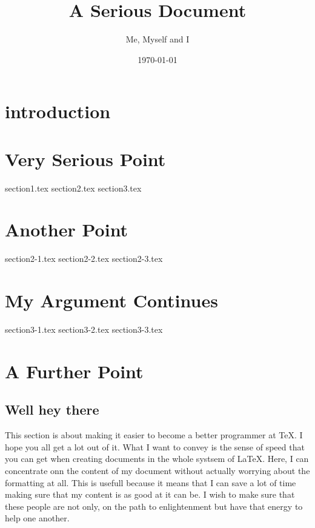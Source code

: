\documentclass[a4paper]{report}
\title{A Serious Document}
\author{Me, Myself and I}
\date{\today}
\begin{document}
\maketitle

\tableofcontents
\pagebreak

\begin{abstract}

\end{abstract}

\chapter{introduction}


\chapter{Very Serious Point}
{section1.tex}
{section2.tex}
{section3.tex}

\chapter{Another Point}
{section2-1.tex}
{section2-2.tex}
{section2-3.tex}

\chapter{My Argument Continues}
{section3-1.tex}
{section3-2.tex}
{section3-3.tex}

\chapter{A Further Point}
\section{Well hey there}
This section is about making it easier to become a better programmer at \TeX. I hope you all get a lot out of it. What I want to convey is the sense of speed that you can get when creating documents in the whole systsem of \LaTeX. Here, I can concentrate onn the content of my document without actually worrying about the formatting at all. This is usefull because it means that I can save a lot of time making sure that my content is as good at it can be. I wish to make sure that these people are not only, on the path to enlightenment but have that energy to help one another.
\end{document}

